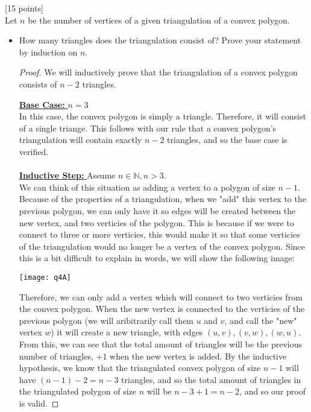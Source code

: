 \documentclass[12pt]{article}
\newcommand{\proofheader}[1]{\noindent \underline{#1}}
\newcommand{\base}{\proofheader{\textbf{Base Case:  }}}
\newcommand{\istep}{\proofheader{\textbf{Inductive Step: }}}
\newcounter{ques}
\newenvironment{question}{\stepcounter{ques}{\noindent\bf Question \arabic{ques}:}}{\vspace{5mm}}
\begin{document}
\begin{question}[15 points]\\
Let $n$ be the number of vertices of a given triangulation of a convex polygon.

\begin{itemize}
	\item How many triangles does the triangulation consist of? Prove your statement by induction on $n$.

  \begin{proof}
    We will inductively prove that the triangulation of a convex polygon consists of $n-2$ triangles.

    \base $n=3$\\
    In this case, the convex polygon is simply a triangle. Therefore, it will consist of a single triange. This follows with our rule that a convex polygon's triangulation will contain exactly $n-2$ triangles, and so the base case is verified.\\\\
    \istep Assume $n\in\mathbb{N}, n>3$.\\
    We can think of this situation as adding a vertex to a polygon of size $n-1$.\\
    Because of the properties of a triangulation, when we "add" this vertex to the previous polygon, we can only have it so edges will be created between the new vertex, and two verticies of the polygon. This is because if we were to connect to three or more verticies, this would make it so that some verticies of the triangulation would no longer be a vertex of the convex polygon. Since this is a bit difficult to explain in words, we will show the following image:
    \begin{center}
      \texttt{[image: q4A]}
    \end{center}
    Therefore, we can only add a vertex which will connect to two verticies from the convex polygon. When the new vertex is connected to the verticies of the previous polygon (we will aribitrarily call them $u$ and $v$, and call the "new" vertex $w$) it will create a new triangle, with edges $(u,v), (v,w), (w,u)$.\\
    From this, we can see that the total amount of triangles will be the previous number of triangles, $+1$ when the new vertex is added. By the inductive hypothesis, we know that the triangulated convex polygon of size $n-1$ will have $(n-1)-2=n-3$ triangles, and so the total amount of triangles in the triangulated polygon of size $n$ will be $n-3+1=n-2$, and so our proof is valid.
  \end{proof}



\end{itemize}
\end{question}
\end{document}
